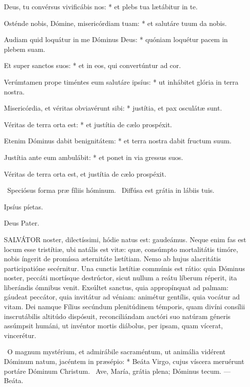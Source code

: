 Deus, tu convérsus vivificábis nos: * et plebs tua lætábitur in te.

Osténde nobis, Dómine, misericórdiam tuam: * et salutáre tuum da nobis.

Audiam quid loquátur in me Dóminus Deus: * quóniam loquétur pacem in plebem suam.

Et super sanctos suos: * et in eos, qui convertúntur ad cor.

Verúmtamen prope timéntes eum salutáre ipsíus: * ut inhábitet glória in terra nostra.

Misericórdia, et véritas obviavérunt sibi: * justítia, et pax osculátæ sunt.

Véritas de terra orta est: * et justítia de cælo prospéxit.

Etenim Dóminus dabit benignitátem: * et terra nostra dabit fructum suum.

Justítia ante eum ambulábit: * et ponet in via gressus suos.

 Véritas de terra orta est, et justítia de cælo prospéxit.

\V\ Speciósus forma præ fíliis hóminum. \R\ Diffúsa est grátia in lábiis tuis.

 Ipsíus píetas.

 Deus Pater.




\lettrine[lines=2]{S}{ALVÁTOR} noster, dilectíssimi, hódie natus est: gaudeámus. Neque enim fas est locum esse tristítiæ, ubi natális est vitæ: quæ, consúmpto mortalitátis timóre, nobis íngerit de promíssa æternitáte lætítiam. Nemo ab hujus alacritátis participatióne secérnitur. Una cunctis lætítiæ commúnis est rátio: quia Dóminus noster, peccáti mortísque destrúctor, sicut nullum a reátu líberum réperit, ita liberándis ómnibus venit. Exsúltet sanctus, quia appropínquat ad palmam: gáudeat peccátor, quia invitátur ad véniam: animétur gentílis, quia vocátur ad vitam. Dei namque Fílius secúndum plenitúdinem témporis, quam divíni consílii inscrutábilis altitúdo dispósuit, reconciliándam auctóri suo natúram géneris assúmpsit humáni, ut invéntor mortis diábolus, per ipsam, quam vícerat, vincerétur.

\R\ O magnum mystérium, et admirábile sacraméntum, ut animália vidérent Dóminum natum, jacéntem in præsépio: * Beáta Virgo, cujus víscera meruérunt portáre Dóminum Christum. \V\ Ave, María, grátia plena; Dóminus tecum. --- Beáta.

